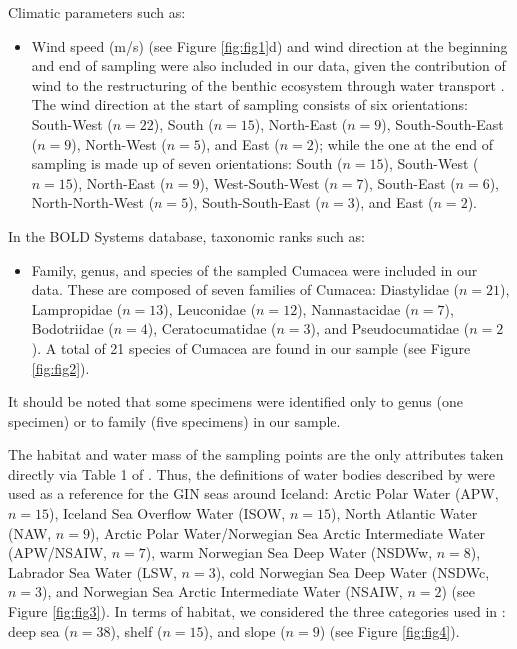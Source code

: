 Climatic parameters such as: 
\begin{itemize}
\item Wind speed (m/s) (see Figure \ref{fig:fig1}d) and wind direction at the beginning and end of sampling were also included in our data, given the contribution of wind to the restructuring of the benthic ecosystem through water transport \citep{waga_recent_2020,saeedi_environmental_2022}. 
The wind direction at the start of sampling consists of six orientations: South-West ($n=22$), South ($n=15$), North-East ($n=9$), South-South-East ($n=9$), North-West ($n=5$), and East ($n=2$); while the one at the end of sampling is made up of seven orientations: South ($n=15$), South-West ($n=15$), North-East ($n=9$), West-South-West ($n=7$), South-East ($n=6$), North-North-West ($n=5$), South-South-East ($n=3$), and East ($n=2$). 
\end{itemize}

In the BOLD Systems database, taxonomic ranks such as: 
\begin{itemize}
\item Family, genus, and species of the sampled Cumacea were included in our data. These are composed of seven families of Cumacea: Diastylidae ($n=21$), Lampropidae ($n=13$), Leuconidae ($n=12$), Nannastacidae ($n=7$), Bodotriidae ($n=4$), Ceratocumatidae ($n=3$), and Pseudocumatidae ($n=2$). A total of 21 species of Cumacea are found in our sample (see Figure \ref{fig:fig2}).
\end{itemize}

It should be noted that some specimens were identified only to genus (one specimen) or to family (five specimens) in our sample.
 
The habitat and water mass of the sampling points are the only attributes taken directly via Table 1 of \citep{uhlir_adding_2021}. Thus, the definitions of water bodies described by \citep{hansen_north_2000, brix2010distribution, ostmann_marine_2014} were used as a reference for the GIN seas around Iceland: Arctic Polar Water (APW, $n=15$), Iceland Sea Overflow Water (ISOW, $n=15$), North Atlantic Water (NAW, $n=9$), Arctic Polar Water/Norwegian Sea Arctic Intermediate Water (APW/NSAIW, $n=7$), warm Norwegian Sea Deep Water (NSDWw, $n=8$), Labrador Sea Water (LSW, $n=3$), cold Norwegian Sea Deep Water (NSDWc, $n=3$), and Norwegian Sea Arctic Intermediate Water (NSAIW, $n=2$) (see Figure \ref{fig:fig3}). In terms of habitat, we considered the three categories used in \citep{uhlir_adding_2021}: deep sea ($n=38$), shelf ($n=15$), and slope ($n=9$) (see Figure \ref{fig:fig4}).

